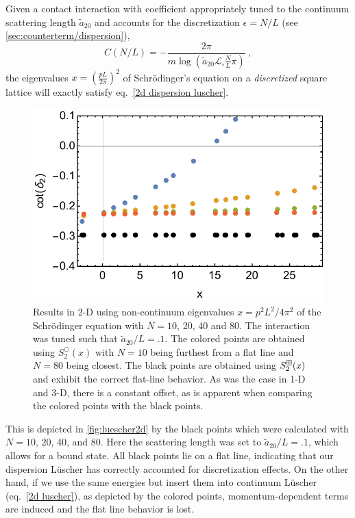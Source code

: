 Given a contact interaction with coefficient appropriately tuned to the continuum scattering length $\tilde a_{20}$ and accounts for the discretization $\epsilon=N/L$ (see \autoref{sec:counterterm/dispersion}),
\begin{equation}
C(N/L)=-\frac{2 \pi}{m \log \left(\tilde a_{20} \mathcal{L}_\square \frac{N}{L}\pi\right)}\ ,
\end{equation}
the eigenvalues $x=\left(\frac{pL}{2\pi}\right)^2$ of Schr\"odinger's equation on a \emph{discretized} square lattice will exactly satisfy eq.~\eqref{2d dispersion luscher}.
\begin{figure}
\center
\includegraphics[width=.65\textwidth]{figure/luescher2d.pdf}
\caption{Results in 2-D using non-continuum eigenvalues $x=p^2L^2/4\pi^2$ of the Schr\"odinger equation with $N=10$, 20, 40 and 80.  The interaction was tuned such that $\tilde a_{20}/L=.1$.  The colored points are obtained using $S^\bigcirc_2(x)$ with $N=10$ being furthest from a flat line and $N=80$ being closest.  The black points are obtained using $S^{\boxplus}_2(x)$  and exhibit the correct flat-line behavior.  As was the case in 1-D and 3-D, there is a constant offset, as is apparent when comparing the colored points with the black points.  \label{fig:luescher2d}}
\end{figure}
This is depicted in \autoref{fig:luescher2d} by the black points which were calculated with $N=10$, 20, 40, and 80.  Here the scattering length was set to $\tilde a_{20}/L = .1$, which allows for a bound state.  All black points lie on a flat line, indicating that our dispersion L\"uscher has correctly accounted for discretization effects.  On the other hand, if we use the same energies but insert them into continuum L\"uscher (eq.~\eqref{2d luscher}), as depicted by the colored points, momentum-dependent terms are induced and the flat line behavior is lost.

